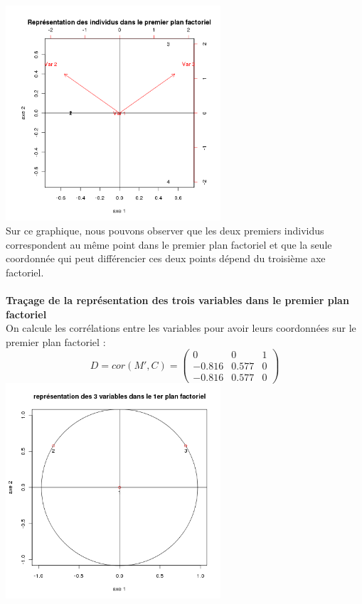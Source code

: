 \documentclass[a4paper, 10pt]{article}
\begin{document}
\includegraphics[height = 8cm, width = 8cm]{plots/plot_composantes_principales.png}\\
Sur ce graphique, nous pouvons observer que les deux premiers individus correspondent au m\^eme point dans le premier plan factoriel
et que la seule coordonn\'ee qui peut diff\'erencier ces deux points d\'epend du troisi\`eme axe factoriel.\\ \\
\textbf{Traçage de la repr\'esentation des trois variables dans le premier plan factoriel}\\
On calcule les corr\'elations entre les variables pour avoir leurs coordonn\'ees sur le premier plan factoriel :\\
\[D = cor(M', C) =
\begin{pmatrix}
0 & 0 & 1\\
-0.816 & 0.577 & 0\\
-0.816 & 0.577 & 0
\end{pmatrix}\]
\includegraphics[height = 8cm, width = 8cm]{plots/plot_correlation.png}\\
\end{document}
